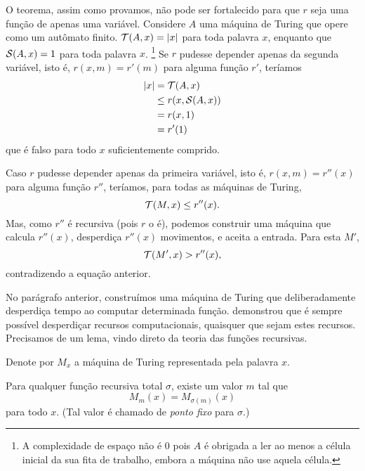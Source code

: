 O teorema,
assim como provamos,
não pode ser fortalecido
para que $r$ seja uma função de apenas uma variável.
Considere $A$ uma máquina de Turing
que opere como um autômato finito.
${\mathcal{T}}(A, x) = |x|$ para toda palavra $x$,
enquanto que ${\mathcal{S}}(A, x) = 1$ para toda palavra $x$.%
\footnote{
    A complexidade de espaço não é $0$
    pois $A$ é obrigada a ler
    ao menos a célula inicial da sua fita de trabalho,
    embora a máquina não use aquela célula.
}
Se $r$ pudesse depender apenas da segunda variável,
isto é, $r(x, m) = r'(m)$ para alguma função $r'$,
teríamos
\begin{align*}
    |x| &= {\mathcal{T}}(A, x) \\
        &\leq r(x, {\mathcal{S}}(A, x)) \\
        &= r(x, 1) \\
        &= r'(1)
\end{align*}
que é falso para todo $x$ suficientemente comprido.

Caso $r$ pudesse depender apenas da primeira variável,
isto é, $r(x, m) = r''(x)$ para alguma função $r''$,
teríamos, para todas as máquinas de Turing,
\begin{equation*}
    {\mathcal{T}}(M, x) \leq r''(x).
\end{equation*}
Mas, como $r''$ é recursiva
(pois $r$ o é),
podemos construir uma máquina que calcula $r''(x)$,
desperdiça $r''(x)$ movimentos,
e aceita a entrada.
Para esta $M'$,
\begin{equation*}
    {\mathcal{T}}(M', x) > r''(x),
\end{equation*}
contradizendo a equação anterior.

No parágrafo anterior,
construímos uma máquina de Turing
que deliberadamente desperdiça tempo
ao computar determinada função.
 demonstrou que
é sempre possível desperdiçar recursos computacionais,
quaisquer que sejam estes recursos.
Precisamos de um lema,
vindo direto da teoria das funções recursivas.

\begin{lemma}
    Denote por $M_x$ a máquina de Turing
    representada pela palavra $x$.

    Para qualquer função recursiva total $\sigma$,
    existe um valor $m$ tal que
    \begin{equation*}
        M_m(x) = M_{\sigma(m)}(x)
    \end{equation*}
    para todo $x$.
    (Tal valor é chamado de \emph{ponto fixo} para $\sigma$.)
    \label{thm:recursion}
\end{lemma}

